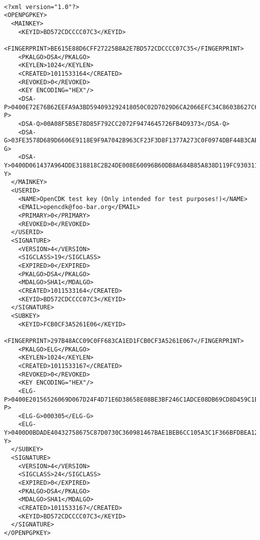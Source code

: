 \begin{verbatim}

<?xml version="1.0"?>
<OPENPGPKEY>
  <MAINKEY>
    <KEYID>BD572CDCCCC07C3</KEYID>
    <FINGERPRINT>BE615E88D6CFF27225B8A2E7BD572CDCCCC07C35</FINGERPRINT>
    <PKALGO>DSA</PKALGO>
    <KEYLEN>1024</KEYLEN>
    <CREATED>1011533164</CREATED>
    <REVOKED>0</REVOKED>
    <KEY ENCODING="HEX"/>
    <DSA-P>0400E72E76B62EEFA9A3BD594093292418050C02D7029D6CA2066EFC34C86038627C643EB1A652A7AF1D37CF46FC505AC1E0C699B37895B4BCB3E53541FFDA4766D6168C2B8AAFD6AB22466D06D18034D5DAC698E6993BA5B350FF822E1CD8702A75114E8B73A6B09CB3B93CE44DBB516C9BB5F95BB666188602A0A1447236C0658F</DSA-P>
    <DSA-Q>00A08F5B5E78D85F792CC2072F9474645726FB4D9373</DSA-Q>
    <DSA-G>03FE3578D689D6606E9118E9F9A7042B963CF23F3D8F1377A273C0F0974DBF44B3CABCBE14DD64412555863E39A9C627662D77AC36662AE449792C3262D3F12E9832A7565309D67BA0AE4DF25F5EDA0937056AD5BE89F4069EBD7EC76CE432441DF5D52FFFD06D39E5F61E36947B698A77CB62AB81E4A4122BF9050671D9946C865E</DSA-G>
    <DSA-Y>0400D061437A964DDE318818C2B24DE008E60096B60DB8A684B85A838D119FC930311889AD57A3B927F448F84EB253C623EDA73B42FF78BCE63A6A531D75A64CE8540513808E9F5B10CE075D3417B801164918B131D3544C8765A8ECB9971F61A09FC73D509806106B5977D211CB0E1D04D0ED96BCE89BAE8F73D800B052139CBF8D</DSA-Y>
  </MAINKEY>
  <USERID>
    <NAME>OpenCDK test key (Only intended for test purposes!)</NAME>
    <EMAIL>opencdk@foo-bar.org</EMAIL>
    <PRIMARY>0</PRIMARY>
    <REVOKED>0</REVOKED>
  </USERID>
  <SIGNATURE>
    <VERSION>4</VERSION>
    <SIGCLASS>19</SIGCLASS>
    <EXPIRED>0</EXPIRED>
    <PKALGO>DSA</PKALGO>
    <MDALGO>SHA1</MDALGO>
    <CREATED>1011533164</CREATED>
    <KEYID>BD572CDCCCC07C3</KEYID>
  </SIGNATURE>
  <SUBKEY>
    <KEYID>FCB0CF3A5261E06</KEYID>
    <FINGERPRINT>297B48ACC09C0FF683CA1ED1FCB0CF3A5261E067</FINGERPRINT>
    <PKALGO>ELG</PKALGO>
    <KEYLEN>1024</KEYLEN>
    <CREATED>1011533167</CREATED>
    <REVOKED>0</REVOKED>
    <KEY ENCODING="HEX"/>
    <ELG-P>0400E20156526069D067D24F4D71E6D38658E08BE3BF246C1ADCE08DB69CD8D459C1ED335738410798755AFDB79F1797CF022E70C7960F12CA6896D27CFD24A11CD316DDE1FBCC1EA615C5C31FEC656E467078C875FC509B1ECB99C8B56C2D875C50E2018B5B0FA378606EB6425A2533830F55FD21D649015615D49A1D09E9510F5F</ELG-P>
    <ELG-G>000305</ELG-G>
    <ELG-Y>0400D0BDADE40432758675C87D0730C360981467BAE1BEB6CC105A3C1F366BFDBEA12E378456513238B8AD414E52A2A9661D1DF1DB6BB5F33F6906166107556C813224330B30932DB7C8CC8225672D7AE24AF2469750E539B661EA6475D2E03CD8D3838DC4A8AC4AFD213536FE3E96EC9D0AEA65164B576E01B37A8DCA89F2B257D0</ELG-Y>
  </SUBKEY>
  <SIGNATURE>
    <VERSION>4</VERSION>
    <SIGCLASS>24</SIGCLASS>
    <EXPIRED>0</EXPIRED>
    <PKALGO>DSA</PKALGO>
    <MDALGO>SHA1</MDALGO>
    <CREATED>1011533167</CREATED>
    <KEYID>BD572CDCCCC07C3</KEYID>
  </SIGNATURE>
</OPENPGPKEY>

\end{verbatim}
